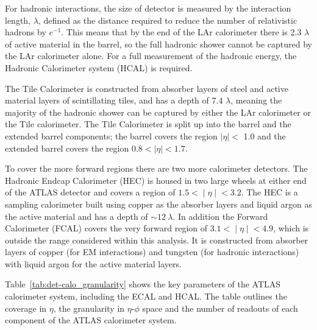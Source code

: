 For hadronic interactions, the size of detector is measured by the interaction length, $\lambda$,
defined as the distance required to reduce the number of relativistic hadrons by $e^{-1}$.
This means that by the end of the LAr calorimeter there is 2.3 $\lambda$ of active material in the barrel,
so the full hadronic shower cannot be captured by the LAr calorimeter alone.
For a full measurement of the hadronic energy, the Hadronic Calorimeter system (HCAL) is required. 

The Tile Calorimeter is constructed from absorber layers of steel and active material layers of scintillating tiles,
and has a depth of 7.4 $\lambda$, meaning the majority of the hadronic shower can be captured by either the LAr calorimeter or the Tile calorimeter.
The Tile Calorimeter is split up into the barrel and the extended barrel components;
the barrel covers the region $|\eta| <$ 1.0 and the extended barrel covers the region $0.8 < |\eta| < 1.7$. 

To cover the more forward regions there are two more calorimeter detectors.
The Hadronic Endcap Calorimeter (HEC) is housed in two large wheels at either end of the ATLAS detector
and covers a region of $1.5 < ∣\eta∣ < 3.2$.
The HEC is a sampling calorimeter built using copper as the absorber layers and liquid argon as the active material
and has a depth of $\sim 12~\lambda$.
In addition the Forward Calorimeter (FCAL) covers the very forward region of $3.1 < ∣\eta∣ < 4.9$,
which is outside the range considered within this analysis.
It is constructed from absorber layers of
copper (for EM interactions)
and tungsten (for hadronic interactions)
with liquid argon for the active material layers.

Table~\ref{tab:det-calo_granularity} shows the key parameters of the ATLAS calorimeter system, including the ECAL and HCAL.
The table outlines the coverage in $\eta$,
the granularity in $\eta$-$\phi$ space
and the number of readouts of each component of the ATLAS calorimeter system.

